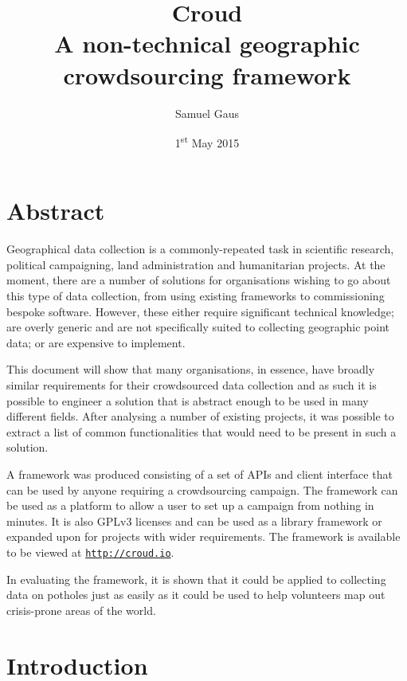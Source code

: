 \documentclass{article}
\let\oldsection\section
\renewcommand\section{\clearpage\oldsection}
\begin{document}
	\title{Croud \\ \vspace{2 mm} {\large A non-technical geographic crowdsourcing framework}}
	\author{Samuel Gaus}
	\date{1\textsuperscript{st} May 2015}
	\maketitle

	\tableofcontents

	\section*{Abstract}
	\label{sec:summary}
		Geographical data collection is a commonly-repeated task in scientific research, political campaigning, land administration and humanitarian projects. At the moment, there are a number of solutions for organisations wishing to go about this type of data collection, from using existing frameworks to commissioning bespoke software. However, these either require significant technical knowledge; are overly generic and are not specifically suited to collecting geographic point data; or are expensive to implement.

		This document will show that many organisations, in essence, have broadly similar requirements for their crowdsourced data collection and as such it is possible to engineer a solution that is abstract enough to be used in many different fields. After analysing a number of existing projects, it was possible to extract a list of common functionalities that would need to be present in such a solution.

		A framework was produced consisting of a set of APIs and client interface that can be used by anyone requiring a crowdsourcing campaign. The framework can be used as a platform to allow a user to set up a campaign from nothing in minutes. It is also GPLv3 licenses and can be used as a library framework or expanded upon for projects with wider requirements. The framework is available to be viewed at \href{http://croud.io}{\nolinkurl{http://croud.io}}.

		In evaluating the framework, it is shown that it could be applied to collecting data on potholes just as easily as it could be used to help volunteers map out crisis-prone areas of the world.

	\section{Introduction}
	\label{sec:introduction}
\end{document}
